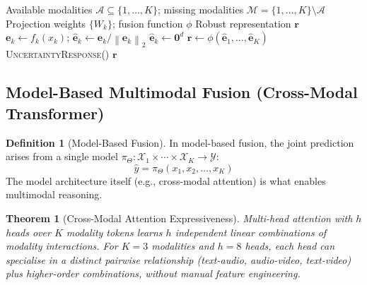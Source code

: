 \documentclass[12pt,a4paper]{article}
\theoremstyle{definition}
\newtheorem{definition}{Definition}[section]
\theoremstyle{plain}
\newtheorem{theorem}{Theorem}[section]
\theoremstyle{remark}
\newcommand{\Norm}[1]{\left\|#1\right\|_2}
\begin{document}
\begin{algorithm}[H]
\caption{Missing-Modality Robust Inference}
\label{alg:missing_modal}
\begin{algorithmic}[1]
\Require Available modalities $\mathcal{A} \subseteq \{1,\ldots,K\}$; missing modalities $\mathcal{M} = \{1,\ldots,K\}\setminus\mathcal{A}$
\Require Projection weights $\{W_k\}$; fusion function $\phi$
\Ensure Robust representation $\mathbf{r}$
    \State $\mathbf{e}_k \gets f_k(x_k)$; $\hat{\mathbf{e}}_k \gets \mathbf{e}_k / \Norm{\mathbf{e}_k}$
  \Else
    \State $\hat{\mathbf{e}}_k \gets \bm{0}^d$ 
  \EndIf
\EndFor
\State $\mathbf{r} \gets \phi(\hat{\mathbf{e}}_1, \ldots, \hat{\mathbf{e}}_K)$
  \State \Return \textsc{UncertaintyResponse}()
\EndIf
\State \Return $\mathbf{r}$
\end{algorithmic}
\end{algorithm}

\subsection{Model-Based Multimodal Fusion (Cross-Modal Transformer)}

\begin{definition}[Model-Based Fusion]
In model-based fusion, the joint prediction arises from a single model $\pi_\Theta : \mathcal{X}_1 \times \cdots \times \mathcal{X}_K \to \mathcal{Y}$:
\[
  \hat{y} = \pi_\Theta(x_1, x_2, \ldots, x_K)
\]
The model architecture itself (e.g., cross-modal attention) is what enables multimodal reasoning.
\end{definition}

\begin{theorem}[Cross-Modal Attention Expressiveness]
Multi-head attention with $h$ heads over $K$ modality tokens learns $h$ independent linear combinations of modality interactions. For $K=3$ modalities and $h=8$ heads, each head can specialise in a distinct pairwise relationship (text-audio, audio-video, text-video) plus higher-order combinations, without manual feature engineering.
\end{theorem}
\end{document}
